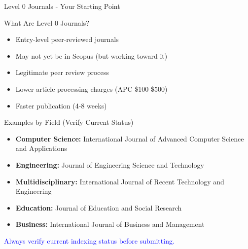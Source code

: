 \documentclass[11pt]{beamer}
\begin{document}
	\begin{frame}{Level 0 Journals - Your Starting Point}
		\scriptsize
		\begin{block}{What Are Level 0 Journals?}
			\begin{itemize}
				\item Entry-level peer-reviewed journals
				\item May not yet be in Scopus (but working toward it)
				\item Legitimate peer review process
				\item Lower article processing charges (APC \$100-\$500)
				\item Faster publication (4-8 weeks)
			\end{itemize}
		\end{block}
		\begin{block}{Examples by Field (Verify Current Status)}
			\begin{itemize}
				\item \textbf{Computer Science:} International Journal of Advanced Computer Science and Applications
				\item \textbf{Engineering:} Journal of Engineering Science and Technology
				\item \textbf{Multidisciplinary:} International Journal of Recent Technology and Engineering
				\item \textbf{Education:} Journal of Education and Social Research
				\item \textbf{Business:} International Journal of Business and Management
			\end{itemize}
			\textcolor{blue}{Always verify current indexing status before submitting.}
		\end{block}
	\end{frame}
	
\end{document}
